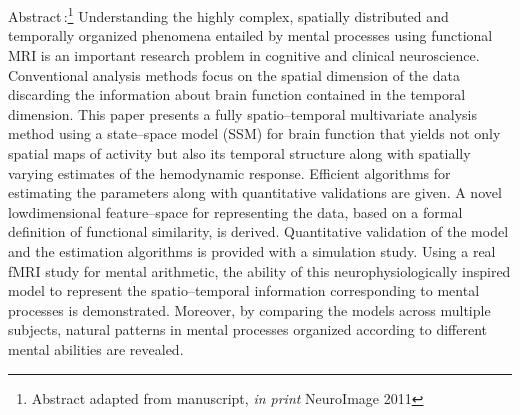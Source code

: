 \documentclass[12pt,twoside]{article}
\newcommand{\HMM}{{\color{darkred}\textbf{\textsf{HMM\ }}}}
\begin{document}
\tableofcontents

\cleartooddpage


%








\enlargethispage{13mm}

\vspace*{-6mm}


\section*{\scalebox{2}{\Huge{{\color{studyblue}Manual\,:} \HMM}}}

\vspace{4mm}

\begin{spacing}{1.25}

{\textsf{Abstract\,:}}\footnote{Abstract adapted from manuscript,
  \emph{in print} NeuroImage 2011} Understanding the highly complex,
spatially distributed and temporally organized phenomena entailed by
mental processes using functional MRI is an important research problem
in cognitive and clinical neuroscience. Conventional analysis methods
focus on the spatial dimension of the data discarding the information
about brain function contained in the temporal dimension. This paper
presents a fully spatio–temporal multivariate analysis method using a
state–space model (SSM) for brain function that yields not only
spatial maps of activity but also its temporal structure along with
spatially varying estimates of the hemodynamic response. Efficient
algorithms for estimating the parameters along with quantitative
validations are given. A novel lowdimensional feature–space for
representing the data, based on a formal definition of functional
similarity, is derived. Quantitative validation of the model and the
estimation algorithms is provided with a simulation study. Using a
real fMRI study for mental arithmetic, the ability of this
neurophysiologically inspired model to represent the spatio–temporal
information corresponding to mental processes is demonstrated.
Moreover, by comparing the models across multiple subjects, natural
patterns in mental processes organized according to different mental
abilities are revealed.

\end{spacing}
\end{document}
